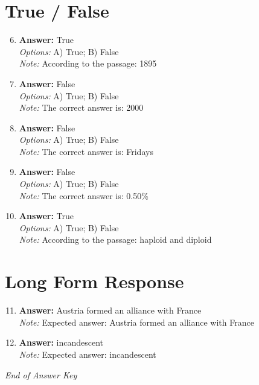\documentclass[12pt]{article}
\begin{document}
\section*{True / False}
\begin{enumerate}[label=\arabic*.]
\setcounter{enumi}{5}
\item \textbf{Answer:} True
\\ \textit{Options:} A) True; B) False
\\ \textit{Note:} According to the passage: 1895
\item \textbf{Answer:} False
\\ \textit{Options:} A) True; B) False
\\ \textit{Note:} The correct answer is: 2000
\item \textbf{Answer:} False
\\ \textit{Options:} A) True; B) False
\\ \textit{Note:} The correct answer is: Fridays
\item \textbf{Answer:} False
\\ \textit{Options:} A) True; B) False
\\ \textit{Note:} The correct answer is: 0.50\%
\item \textbf{Answer:} True
\\ \textit{Options:} A) True; B) False
\\ \textit{Note:} According to the passage: haploid and diploid
\end{enumerate}

\section*{Long Form Response}
\begin{enumerate}[label=\arabic*.]
\setcounter{enumi}{10}
\item \textbf{Answer:} Austria formed an alliance with France
\\ \textit{Note:} Expected answer: Austria formed an alliance with France
\item \textbf{Answer:} incandescent
\\ \textit{Note:} Expected answer: incandescent
\end{enumerate}

\vfill
\noindent\textit{End of Answer Key}
\end{document}
